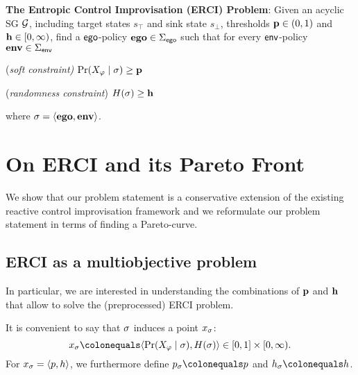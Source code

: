{{{{\begin{mdframed}
\textbf{The Entropic Control Improvisation (ERCI) Problem}:
Given an acyclic SG $\mathcal{G}$, including target states $s_\top$ and sink state $s_\bot$, thresholds $\mathbf{p} \in (0,1)$ and $\mathbf{h} \in [0,\infty)$,  find a $\mathsf{ego}$-policy $\mathbf{ego} \in \Sigma_{\mathsf{ego}}$  such that for every $\mathsf{env}$-policy $\mathbf{env} \in \Sigma_{\mathsf{env}}$ \begin{compactenum}
	\item (\emph{soft constraint)} $\Pr(X_\varphi \mid \sigma) \geq \mathbf{p}$
\item (\emph{randomness constraint}) $H(\sigma) \geq \mathbf{h}$
\end{compactenum}
where  $\sigma = \langle \mathbf{ego}, \mathbf{env} \rangle$.
\end{mdframed}

\begin{example}
	
\end{example}


\section{On ERCI and its Pareto Front}
We show that our problem statement is a conservative extension of the existing reactive control improvisation framework and we reformulate our problem statement in terms of finding a Pareto-curve.

\subsection{ERCI as a multiobjective problem}

In particular, we are interested in understanding the combinations of $\mathbf{p}$ and $\mathbf{h}$ that allow to solve the (preprocessed) ERCI problem. 

It is convenient to say that $\sigma$ induces a point $x_\sigma$: \[x_\sched \colonequals \langle \Pr(X_\varphi \mid \sched), H(\sched)  \rangle \in [0,1] \times [0,\infty).\] 
For $x_\sigma = \langle p,h \rangle$, we furthermore define $\scp_\sched \colonequals \scp$ and $\rndp_\sched \colonequals \rndp$.

}}}}
